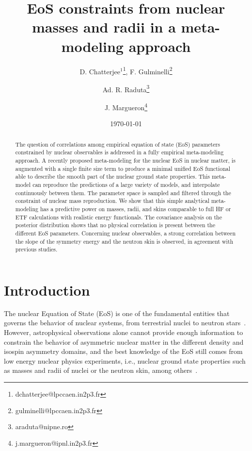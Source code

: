 \documentclass
[aps,prc,twocolumn,showpacs,showkeys,amsmath,floatfix,superscriptaddress]{revtex4}
\begin{document}
\title{EoS constraints from nuclear masses and radii in a meta-modeling approach}

\author{D. Chatterjee$^1$\thanks{dchatterjee@lpccaen.in2p3.fr}, F. Gulminelli\thanks{gulminelli@lpccaen.in2p3.fr}}
\author{Ad. R. Raduta\thanks{araduta@nipne.ro}}
\author{J. Margueron\thanks{j.margueron@ipnl.in2p3.fr}}


\date{\today}



\begin{abstract}
The question of correlations among empirical equation of state (EoS) parameters constrained by nuclear observables is addressed in a fully empirical meta-modeling approach.  {A recently proposed meta-modeling for the nuclear EoS in nuclear matter}, is augmented with a single finite size term to produce a minimal unified EoS functional able to describe the smooth part of the nuclear ground state properties. This meta-model can  reproduce the predictions of a large variety of models, and interpolate continuously between them. The parameter space is sampled and filtered through the constraint of nuclear mass reproduction. We show that this simple  analytical meta-modeling has a predictive power on masses, radii, and skins comparable to full HF or ETF calculations with realistic energy functionals. 
The covariance analysis on the posterior distribution shows that no physical correlation is present between the different EoS parameters. 
Concerning nuclear observables, a strong correlation between the slope of the symmetry energy and the neutron skin is observed, in agreement with previous studies.
\end{abstract}

\maketitle

\section{Introduction}

The nuclear Equation of State (EoS) is one of the fundamental entities that governs the behavior of nuclear systems, from terrestrial nuclei to neutron stars~\cite{oertel16}. However, astrophysical observations alone cannot provide enough information to constrain the behavior of asymmetric nuclear matter in the different density and isospin asymmetry domains, and the best knowledge of the EoS still comes from low energy nuclear physics experiments, i.e., nuclear ground state properties such as masses and radii of nuclei or the neutron skin, among others~\cite{epja50,Lattimer16}. 
\end{document}
